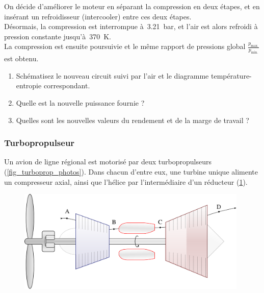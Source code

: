 	On décide d’améliorer le moteur en séparant la compression en deux étapes, et en insérant un refroidisseur (intercooler) entre ces deux étapes.\\
	Désormais, la compression est interrompue à~\SI{3,21}{\bar}, et l’air est alors refroidi à pression constante jusqu’à~\SI{370}{\kelvin}.\\
	La compression est ensuite poursuivie et le même rapport de pressions global $\frac{p_\text{max.}}{p_\text{min.}}$ est obtenu.
	
	\begin{enumerate}
		\item Schématisez le nouveau circuit suivi par l’air et le diagramme température-entropie correspondant.
		\item Quelle est la nouvelle puissance fournie ?
		\item Quelles sont les nouvelles valeurs du rendement et de la marge de travail ?
	\end{enumerate}

\subsubsection{Turbopropulseur}

	
	Un avion de ligne régional est motorisé par deux turbopropulseurs (\cref{fig_turboprop_photos}). Dans chacun d’entre eux, une turbine unique alimente un compresseur axial, ainsi que l’hélice par l’intermédiaire d’un réducteur (\cref{fig_turboprop_circuit}).
	
	\begin{figure}
		\begin{center}
			\includegraphics[width=11cm]{images/circuit_turboprop.png}
		\end{center}
		\label{fig_turboprop_circuit}
	\end{figure}
	
